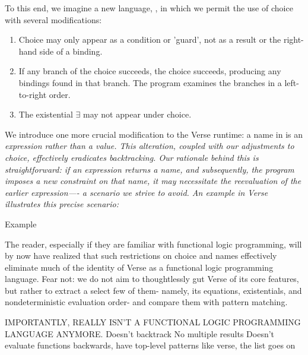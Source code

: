 \documentclass[manuscript,screen,review, 12pt]{acmart}
\begin{document}
\begin{outline}[enumerate]
        To this end, we imagine a new language, \VMinus, in which we permit the use of choice with several modifications:

        \begin{enumerate}
        \item Choice may only appear as a condition or 'guard', not as a result
        or the right-hand side of a binding.
        \item If any branch of the choice succeeds, the choice succeeds,
        producing any bindings found in that branch. The program examines the
        branches in a left-to-right order.
        \item The existential $\exists$ may not appear under choice.
        \end{enumerate}

        We introduce one more crucial modification to the Verse runtime: a name
        in \VMinus is an \it{expression} rather than a \it{value}. This
        alteration, coupled with our adjustments to choice, effectively
         eradicates backtracking. Our rationale
        behind this is straightforward: if an expression returns a name, and
        subsequently, the program imposes a new constraint on that name, it may
        necessitate the reevaluation of the earlier expression—- a scenario we
        strive to avoid. An example in Verse illustrates this precise scenario:

     Example 

        The reader, especially if they are familiar with functional logic
        programming, will by now have realized that such restrictions on choice
        and names effectively eliminate much of the identity of Verse as a
        functional logic programming language. Fear not: we do not aim to
        thoughtlessly gut Verse of its core features, but rather to extract a
        select few of them- namely, its equations, existentials, and
        nondeterministic evaluation order- and compare them with pattern
        matching. 
    

     IMPORTANTLY, \VMinus REALLY ISN'T A FUNCTIONAL LOGIC PROGRAMMING LANGUAGE ANYMORE. 
     Doesn't backtrack
     No multiple results 
     Doesn't evaluate functions backwards, have top-level patterns like verse, the list goes on 

        

\end{outline}
\end{document}
